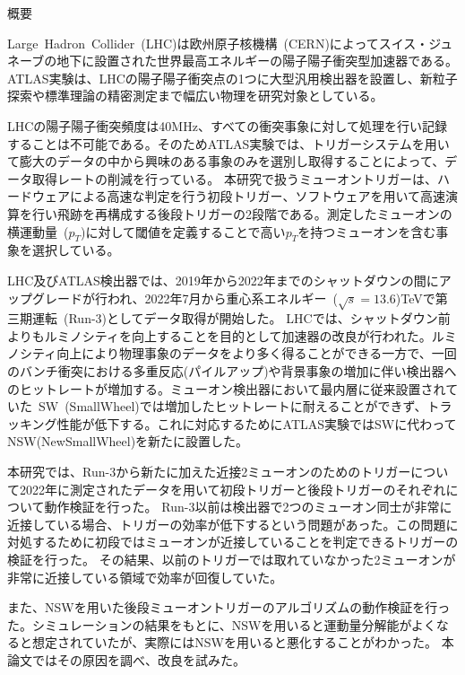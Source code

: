 \begin{center}
  \begin{huge}
    概要
  \end{huge}
\end{center}

\vspace{10pt}

Large~Hadron~Collider~(LHC)は欧州原子核機構~(CERN)によってスイス・ジュネーブの地下に設置された世界最高エネルギーの陽子陽子衝突型加速器である。ATLAS実験は、LHCの陽子陽子衝突点の1つに大型汎用検出器を設置し、新粒子探索や標準理論の精密測定まで幅広い物理を研究対象としている。

LHCの陽子陽子衝突頻度は40MHz、すべての衝突事象に対して処理を行い記録することは不可能である。そのためATLAS実験では、トリガーシステムを用いて膨大のデータの中から興味のある事象のみを選別し取得することによって、データ取得レートの削減を行っている。
本研究で扱うミューオントリガーは、ハードウェアによる高速な判定を行う初段トリガー、ソフトウェアを用いて高速演算を行い飛跡を再構成する後段トリガーの2段階である。測定したミューオンの横運動量~($p_{T}$)に対して閾値を定義することで高い$p_{T}$を持つミューオンを含む事象を選択している。

LHC及びATLAS検出器では、2019年から2022年までのシャットダウンの間にアップグレードが行われ、2022年7月から重心系エネルギー~($\sqrt{s}=13.6$)TeVで第三期運転~(Run-3)としてデータ取得が開始した。
LHCでは、シャットダウン前よりもルミノシティを向上することを目的として加速器の改良が行われた。ルミノシティ向上により物理事象のデータをより多く得ることができる一方で、一回のバンチ衝突における多重反応(パイルアップ)や背景事象の増加に伴い検出器へのヒットレートが増加する。ミューオン検出器において最内層に従来設置されていた~SW~(SmallWheel)では増加したヒットレートに耐えることができず、トラッキング性能が低下する。これに対応するためにATLAS実験ではSWに代わってNSW(NewSmallWheel)を新たに設置した。

本研究では、Run-3から新たに加えた近接2ミューオンのためのトリガーについて2022年に測定されたデータを用いて初段トリガーと後段トリガーのそれぞれについて動作検証を行った。
Run-3以前は検出器で2つのミューオン同士が非常に近接している場合、トリガーの効率が低下するという問題があった。この問題に対処するために初段ではミューオンが近接していることを判定できるトリガーの検証を行った。
その結果、以前のトリガーでは取れていなかった2ミューオンが非常に近接している領域で効率が回復していた。

また、NSWを用いた後段ミューオントリガーのアルゴリズムの動作検証を行った。シミュレーションの結果をもとに、NSWを用いると運動量分解能がよくなると想定されていたが、実際にはNSWを用いると悪化することがわかった。
本論文ではその原因を調べ、改良を試みた。
